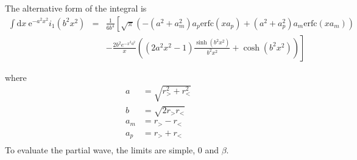 \documentclass[paper=a4, fontsize=11pt]{article} %
\numberwithin{equation}{section} %
\numberwithin{figure}{section} %
\numberwithin{table}{section} %
\newcommand{\re}{{\mathrm{e}}}
\newcommand{\rerfc}{{\mathrm{erfc}}}
\newcommand{\rd}{{\mathrm{d}}}
\newcommand{\rgt}{r_{>}}
\newcommand{\rlt}{r_{<}}
\begin{document}
The alternative form of the integral is 
\begin{eqnarray}
\int \rd x\ \re^{-a^2x^2}i_{1}(b^2x^2)&=& \frac{1}{6b^4} 
\left [
  \sqrt{\pi}\left (-(a^2 + a_m^2) a_p \rerfc(x a_p)+(a^2 + a_p^2) a_m \rerfc(x a_m) \right) \right . \nonumber \\
& & \left .
- \frac{2b^2e^{-x^2 a^2}}{x} \left ((2 a^2 x^2 - 1)\frac{\sinh(b^2x^2)}{b^2x^2} + \cosh(b^2x^2) \right)
\right ]
\end{eqnarray}

where
\begin{equation}
\begin{split}
a   &=  \sqrt{\rgt^2+\rlt^2}\\
b   &=  \sqrt{2\rgt\rlt} \\
a_m &=  \rgt-\rlt \\
a_p &=  \rgt+\rlt \\
\end{split}
\end{equation}
To evaluate the partial wave, the limits are simple, $0$ and $\beta$.
\end{document}
